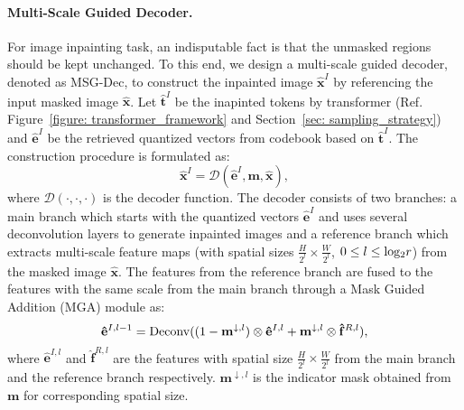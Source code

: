 \documentclass[10pt,twocolumn,letterpaper]{article}
\newcommand{\Fref}[1]{Figure~\ref{#1}}
\newcommand{\Sref}[1]{Section~\ref{#1}}
\begin{document}
\paragraph{Multi-Scale Guided Decoder.}
\label{sec: msg_dec}
For image inpainting task, an indisputable fact is that the unmasked regions should be kept unchanged. To this end, we design a multi-scale guided decoder, denoted as MSG-Dec, to construct the inpainted image $\mathbf{\hat{x}}^{I}$ by referencing the input masked image $\mathbf{\hat{x}}$. 
Let $\mathbf{\hat{t}}^{I}$ be the inapinted tokens by transformer (Ref. \Fref{figure: transformer_framework} and \Sref{sec: sampling_strategy}) and $\mathbf{\hat{e}}^{I}$ be the retrieved quantized vectors from codebook based on $\mathbf{\hat{t}}^I$. The construction procedure is formulated as:
\begin{equation}
	\mathbf{\hat{x}}^{I} = \mathcal{D}(\mathbf{\hat{e}}^{I}, \mathbf{m}, \mathbf{\hat{x}}),
	\label{eq: construction_of_inpainted_image}
\end{equation}
where $\mathcal{D}(\cdot, \cdot, \cdot)$ is the decoder function. The decoder consists of two branches: a main branch which starts with the quantized vectors $\mathbf{\hat{e}}^{I}$ and uses several deconvolution layers to generate inpainted images and a reference branch which extracts multi-scale feature maps (with spatial sizes $\frac{H}{2^{l}} \times \frac{W}{2^{l}}$, $0 \le l \le {\rm log_2}r$) from the masked image $\mathbf{\hat{x}}$. The features from the reference branch are fused to the features with the same scale from the main branch through a Mask Guided Addition (MGA) module as:
\begin{equation}
	\mathbf{\hat{e}}^{I,l-1} = {\rm Deconv}( (1-\mathbf{m}^{\downarrow,l}) \otimes \mathbf{\hat{e}}^{I,l} + \mathbf{m}^{\downarrow,l} \otimes \mathbf{\hat{f}}^{R,l}),
	\label{eq: mask_guided_addition}
\end{equation}
where $\mathbf{\hat{e}}^{I,l}$ and $\mathbf{\hat{f}}^{R,l}$ are the features with spatial size $\frac{H}{2^{l}} \times \frac{W}{2^{l}}$ from the main branch and the reference branch respectively. $\mathbf{m}^{\downarrow,l}$ is the indicator mask obtained from $\mathbf{m}$ for corresponding spatial size.
\end{document}
